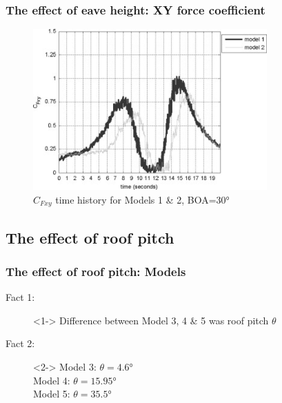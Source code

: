 \documentclass[handout]{beamer}
\begin{document}
\begin{frame}
	\frametitle{The effect of eave height: XY force coefficient}
	\begin{figure}
			\includegraphics[width=0.8\textwidth]{./fig/6.jpg}
			\caption{$C_{Fxy}$ time history for Models 1 \& 2, BOA=\ang{30}}
		\end{figure}
\end{frame}

\subsection{The effect of roof pitch}
\begin{frame}
	\frametitle{The effect of roof pitch: Models}
	\begin{description}
		\item[Fact 1: ]<1-> Difference between Model 3, 4  \& 5 was \alert{roof pitch $\theta$}
		\item[Fact 2: ]<2-> Model 3:  $\theta=\ang{4.6}$ \\
		                                         Model 4:  $\theta=\ang{15.95}$ \\
		                                         Model 5:  $\theta=\ang{35.5}$
	\end{description}
\end{frame}
\end{document}
